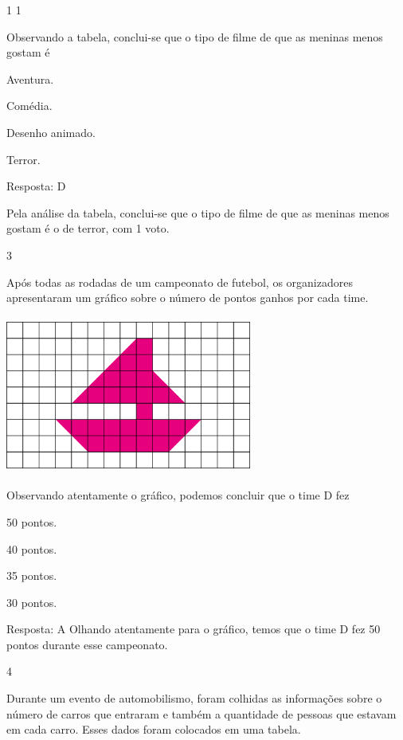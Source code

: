 \begin{escolha}
{\begin{escolha}
{1 1

Observando a tabela, conclui-se que o tipo de filme de que as meninas menos
gostam é

\begin{escolha}

\item
  Aventura.
\item
  Comédia.
\item
  Desenho animado.
\item
  Terror.
\end{escolha}

Resposta: D

Pela análise da tabela, conclui-se que o tipo de filme de que as meninas menos gostam é o de terror, com 1 voto.

\num{3}

Após todas as rodadas de um campeonato de futebol, os organizadores
apresentaram um gráfico sobre o número de pontos ganhos por cada
time.

\includegraphics[width=3.19194in,height=2.04184in]{media/image94.png}

Observando atentamente o gráfico, podemos concluir que o time D fez

\begin{escolha}
\item
  50 pontos.
\item
  40 pontos.
\item
  35 pontos.
\item
  30 pontos.
\end{escolha}

Resposta: A
Olhando atentamente para o gráfico, temos que o time D fez 50 pontos
durante esse campeonato.

\num{4}

Durante um evento de automobilismo, foram colhidas as informações sobre o número de carros
que entraram e também a quantidade de pessoas que estavam em cada carro.
Esses dados foram colocados em uma tabela.

}
\end{escolha}}
\end{escolha}
